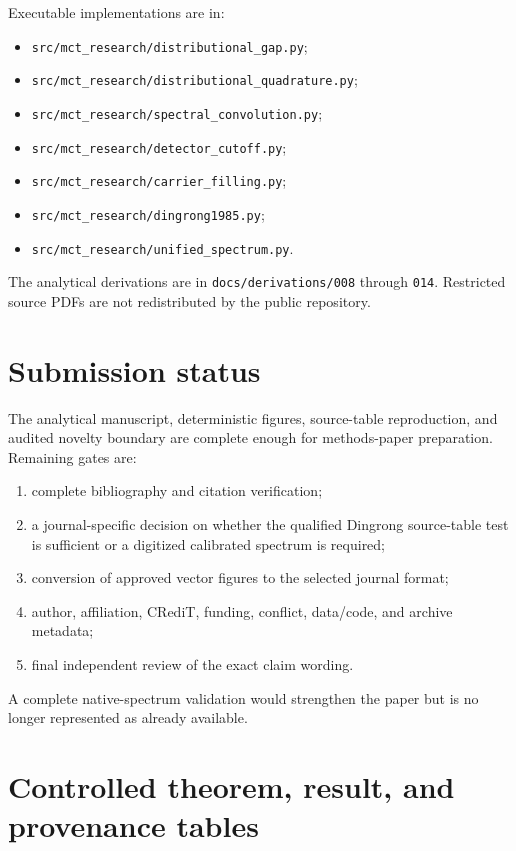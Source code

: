 \documentclass[12pt]{article}
\begin{document}
Executable implementations are in:

\begin{itemize}
\item \texttt{src/mct\_research/distributional\_gap.py};
\item \texttt{src/mct\_research/distributional\_quadrature.py};
\item \texttt{src/mct\_research/spectral\_convolution.py};
\item \texttt{src/mct\_research/detector\_cutoff.py};
\item \texttt{src/mct\_research/carrier\_filling.py};
\item \texttt{src/mct\_research/dingrong1985.py};
\item \texttt{src/mct\_research/unified\_spectrum.py}.
\end{itemize}

The analytical derivations are in \texttt{docs/derivations/008} through \texttt{014}. Restricted source PDFs are not redistributed by the public repository.

\section{Submission status}

The analytical manuscript, deterministic figures, source-table reproduction, and audited novelty boundary are complete enough for methods-paper preparation. Remaining gates are:

\begin{enumerate}
\item complete bibliography and citation verification;
\item a journal-specific decision on whether the qualified Dingrong source-table test is sufficient or a digitized calibrated spectrum is required;
\item conversion of approved vector figures to the selected journal format;
\item author, affiliation, CRediT, funding, conflict, data/code, and archive metadata;
\item final independent review of the exact claim wording.
\end{enumerate}

A complete native-spectrum validation would strengthen the paper but is no longer represented as already available.


\appendix

\section{Controlled theorem, result, and provenance tables}
\end{document}

